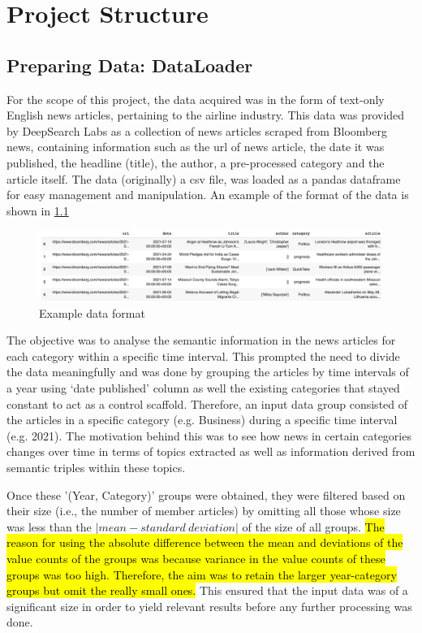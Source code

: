 \chapter{Project Structure}
\vspace{-2ex}

\section{Preparing Data: DataLoader} \label{dataloader}

For the scope of this project, the data acquired was in the form of text-only English news articles, pertaining to the airline industry. This data was provided by DeepSearch Labs as a collection of news articles scraped from Bloomberg news, containing information such as the url of news article, the date it was published, the headline (title), the author, a pre-processed category and the article itself. The data (originally) a csv file, was loaded as a pandas dataframe for easy management and manipulation. An example of the format of the data is shown in \ref{dataframe}

\begin{figure}[H] 
\centering
\includegraphics[width=0.8\linewidth]{images/dataframe.png}
\caption{Example data format}
\label{dataframe}
\end{figure}

The objective was to analyse the semantic information in the news articles for each category within a specific time interval. This prompted the need to divide the data meaningfully and was done by grouping the articles by time intervals of a year using `date published' column as well the existing categories that stayed constant to act as a control scaffold. Therefore, an input data group consisted of the articles in a specific category (e.g. Business) during a specific time interval (e.g. 2021). The motivation behind this was to see how news in certain categories changes over time in terms of topics extracted as well as information derived from semantic triples within these topics.

Once these '(Year, Category)' groups were obtained, they were filtered based on their size (i.e., the number of member articles) by omitting all those whose size was less than the $| mean - standard \ deviation |$ of the size of all groups. \hl{The reason for using the absolute difference between the mean and deviations of the value counts of the groups was because variance in the value counts of these groups was too high. Therefore, the aim was to retain the larger year-category groups but omit the really small ones.} This ensured that the input data was of a significant size in order to yield relevant results before any further processing was done.  

